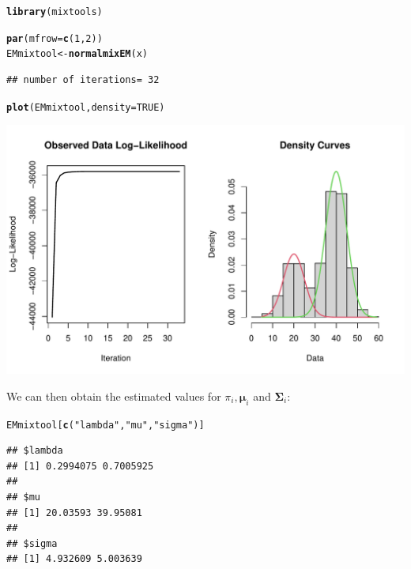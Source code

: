 \documentclass{article}\usepackage[]{graphicx}\usepackage[]{xcolor}
\makeatletter
\def\maxwidth{ %
  \ifdim\Gin@nat@width>\linewidth
    \linewidth
  \else
    \Gin@nat@width
  \fi
}
\newcommand{\hlnum}[1]{\textcolor[rgb]{0.686,0.059,0.569}{#1}}%
\newcommand{\hlstr}[1]{\textcolor[rgb]{0.192,0.494,0.8}{#1}}%
\newcommand{\hlstd}[1]{\textcolor[rgb]{0.345,0.345,0.345}{#1}}%
\newcommand{\hlkwb}[1]{\textcolor[rgb]{0.69,0.353,0.396}{#1}}%
\newcommand{\hlkwc}[1]{\textcolor[rgb]{0.333,0.667,0.333}{#1}}%
\newcommand{\hlkwd}[1]{\textcolor[rgb]{0.737,0.353,0.396}{\textbf{#1}}}%
\newenvironment{kframe}{%
 \def\at@end@of@kframe{}%
 \ifinner\ifhmode%
  \def\at@end@of@kframe{\end{minipage}}%
  \begin{minipage}{\columnwidth}%
 \fi\fi%
 \def\FrameCommand##1{\hskip\@totalleftmargin \hskip-\fboxsep
 \colorbox{shadecolor}{##1}\hskip-\fboxsep
     \hskip-\linewidth \hskip-\@totalleftmargin \hskip\columnwidth}%
 \MakeFramed {\advance\hsize-\width
   \@totalleftmargin\z@ \linewidth\hsize
   \@setminipage}}%
 {\par\unskip\endMakeFramed%
 \at@end@of@kframe}
\newenvironment{knitrout}{}{} %
\theoremstyle{plain}
\theoremstyle{definition}
\theoremstyle{remark}
\newcommand{\boldmu}{\boldsymbol{\mu}}
\newcommand{\boldSigma}{\boldsymbol{\Sigma}}
\makeatother
\begin{document}
\begin{knitrout}
\color{fgcolor}\begin{kframe}
\begin{alltt}
  \hlkwd{library}\hlstd{(mixtools)}
\end{alltt}


{\ttfamily\noindent\itshape\color{messagecolor}{\#\# mixtools package, version 1.2.0, Released 2020-02-05\\\#\# This package is based upon work supported by the National Science Foundation under Grant No. SES-0518772.}}\begin{alltt}
  \hlkwd{par}\hlstd{(}\hlkwc{mfrow}\hlstd{=}\hlkwd{c}\hlstd{(}\hlnum{1}\hlstd{,}\hlnum{2}\hlstd{))}
  \hlstd{EMmixtool} \hlkwb{<-} \hlkwd{normalmixEM}\hlstd{(x)}
\end{alltt}
\begin{verbatim}
## number of iterations= 32
\end{verbatim}
\begin{alltt}
  \hlkwd{plot}\hlstd{(EMmixtool,} \hlkwc{density}\hlstd{=}\hlnum{TRUE}\hlstd{)}
\end{alltt}
\end{kframe}

{\centering \includegraphics[width=\maxwidth]{figure/unnamed-chunk-4-1} 

}


\end{knitrout}
We can then obtain the estimated values for $\pi_i, \boldmu_i$ and $\boldSigma_i$:
\begin{knitrout}
\color{fgcolor}\begin{kframe}
\begin{alltt}
  \hlstd{EMmixtool[}\hlkwd{c}\hlstd{(}\hlstr{"lambda"}\hlstd{,} \hlstr{"mu"}\hlstd{,} \hlstr{"sigma"}\hlstd{)]}
\end{alltt}
\begin{verbatim}
## $lambda
## [1] 0.2994075 0.7005925
## 
## $mu
## [1] 20.03593 39.95081
## 
## $sigma
## [1] 4.932609 5.003639
\end{verbatim}
\end{kframe}
\end{knitrout}
\end{document}
